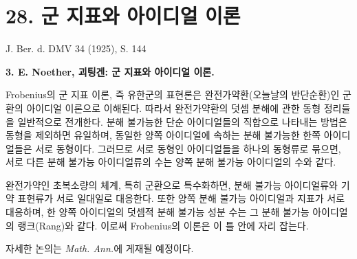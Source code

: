 \documentclass[11pt]{article}
\begin{document}
\section*{28. 군 지표와 아이디얼 이론}

\begin{center}
J. Ber. d. DMV 34 (1925), S. 144
\end{center}

\textbf{3. {\latinfont E. Noether}, 괴팅겐: 군 지표와 아이디얼 이론.}

Frobenius의 군 지표 이론, 즉 유한군의 표현론은 완전가약환(오늘날의 반단순환)인 군환의 아이디얼 이론으로 이해된다. 따라서 완전가약환의 덧셈 분해에 관한 동형 정리들을 일반적으로 전개한다. 분해 불가능한 단순 아이디얼들의 직합으로 나타내는 방법은 동형을 제외하면 유일하며, 동일한 양쪽 아이디얼에 속하는 분해 불가능한 한쪽 아이디얼들은 서로 동형이다. 그러므로 서로 동형인 아이디얼들을 하나의 동형류로 묶으면, 서로 다른 분해 불가능 아이디얼류의 수는 양쪽 분해 불가능 아이디얼의 수와 같다.

완전가약인 초복소량의 체계, 특히 군환으로 특수화하면, 분해 불가능 아이디얼류와 기약 표현류가 서로 일대일로 대응한다. 또한 양쪽 분해 불가능 아이디얼과 지표가 서로 대응하며, 한 양쪽 아이디얼의 덧셈적 분해 불가능 성분 수는 그 분해 불가능 아이디얼의 랭크(Rang)와 같다. 이로써 Frobenius의 이론은 이 틀 안에 자리 잡는다.

자세한 논의는 \emph{Math. Ann.}에 게재될 예정이다.
\end{document}

